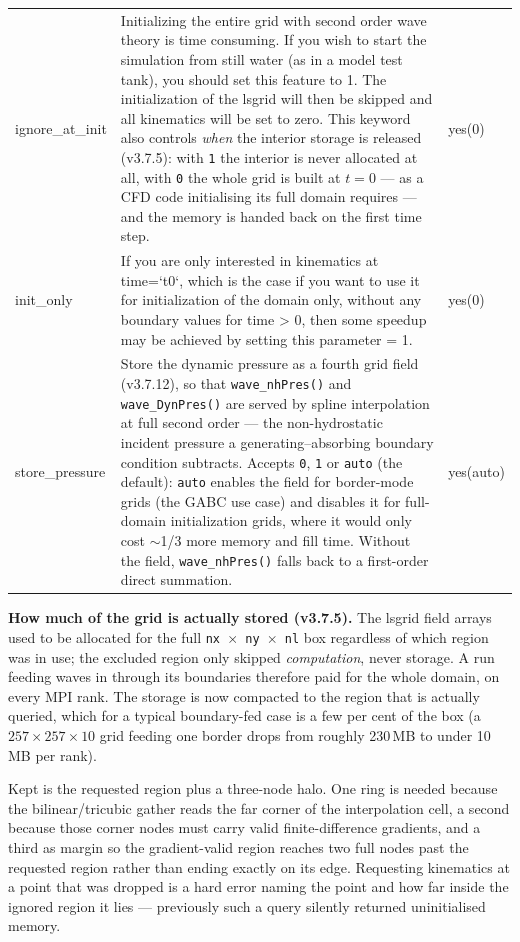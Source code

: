 \begin{xltabular}{\textwidth}{@{}lXl@{}}
ignore\_at\_init&Initializing the entire grid with second order wave theory is time consuming. If you wish to start the simulation from still water (as in a model test tank), you should set this feature to 1. The initialization of the lsgrid will then be skipped and all kinematics will be set to zero. This keyword also controls \emph{when} the interior storage is released (v3.7.5): with \texttt{1} the interior is never allocated at all, with \texttt{0} the whole grid is built at $t=0$ --- as a CFD code initialising its full domain requires --- and the memory is handed back on the first time step.&yes(0)\\
init\_only&If you are only interested in kinematics at time=`t0`, which is the case if you want to use it for initialization of the domain only, without any boundary values for time > 0, then some speedup may be achieved by setting this parameter = 1.&yes(0)\\
store\_pressure&Store the dynamic pressure as a fourth grid field (v3.7.12), so that \texttt{wave\_nhPres()} and \texttt{wave\_DynPres()} are served by spline interpolation at full second order --- the non-hydrostatic incident pressure a generating--absorbing boundary condition subtracts. Accepts \texttt{0}, \texttt{1} or \texttt{auto} (the default): \texttt{auto} enables the field for border-mode grids (the GABC use case) and disables it for full-domain initialization grids, where it would only cost $\sim$1/3 more memory and fill time. Without the field, \texttt{wave\_nhPres()} falls back to a first-order direct summation.&yes(auto)\\
\bottomrule
\end{xltabular}

\textbf{How much of the grid is actually stored (v3.7.5).}
The lsgrid field arrays used to be allocated for the full \texttt{nx\,$\times$\,ny\,$\times$\,nl}
box regardless of which region was in use; the excluded region only skipped
\emph{computation}, never storage. A run feeding waves in through its boundaries
therefore paid for the whole domain, on every MPI rank. The storage is now
compacted to the region that is actually queried, which for a typical
boundary-fed case is a few per cent of the box (a $257\times257\times10$ grid
feeding one border drops from roughly 230\,MB to under 10\,MB per rank).

Kept is the requested region plus a three-node halo. One ring is needed because
the bilinear/tricubic gather reads the far corner of the interpolation cell, a
second because those corner nodes must carry valid finite-difference gradients,
and a third as margin so the gradient-valid region reaches two full nodes past
the requested region rather than ending exactly on its edge. Requesting
kinematics at a point that was dropped is a hard error naming the point and how
far inside the ignored region it lies --- previously such a query silently
returned uninitialised memory.

